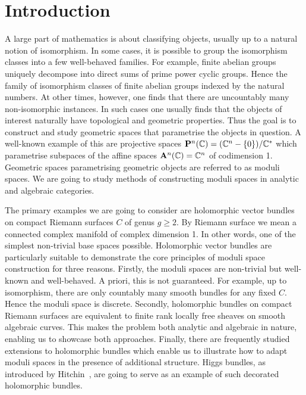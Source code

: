 \documentclass[12pt]{ociamthesis}  %
\begin{document}
\begin{romanpages}          %
  \setcounter{tocdepth}{2}
  \tableofcontents            %
\end{romanpages}            %

\chapter{Introduction}

A large part of mathematics is about classifying objects, usually
up to a natural notion of isomorphism. In some cases,
it is possible to group the isomorphism classes into a few well-behaved
families. For example, finite abelian groups uniquely decompose
into direct sums of prime power cyclic groups. Hence the family of
isomorphism classes of finite abelian groups indexed by the natural
numbers.  At other times, however, one finds that there are uncountably
many non-isomorphic instances. In such cases one usually finds that
the objects of interest naturally have topological and geometric
properties. Thus the goal is to construct and study geometric spaces
that parametrise the objects in question. A well-known example
of this are projective spaces
$\mathbf{P}^{n}_{}(\mathbb C) = (\mathbb C^n - \{0\})/\mathbb C^*$
which parametrise subspaces of the affine spaces $\mathbf{A}^{n}_{}(\mathbb C) = \mathbb C^n$
of codimension 1. Geometric
spaces parametrising geometric objects are referred to as moduli spaces.
We are going to study methods of constructing
moduli spaces in analytic and algebraic categories.

The primary examples we are going to consider are holomorphic
vector bundles on compact Riemann surfaces $C$ of genus $g\geq 2$. By Riemann surface
we mean a connected complex manifold of complex dimension 1. In other words,
one of the simplest non-trivial base spaces possible. Holomorphic vector
bundles are particularly suitable to demonstrate the core principles
of moduli space construction
for three reasons. Firstly, the moduli spaces are non-trivial but
well-known and well-behaved. A priori, this is not guaranteed. For
example, up to isomorphism, there are only countably
many smooth bundles for any fixed $C$. Hence the moduli space is
discrete. Secondly, holomorphic bundles on compact Riemann surfaces are equivalent
to finite rank locally free sheaves on smooth algebraic curves. This
makes the problem both analytic and algebraic in nature, enabling
us to showcase both approaches.
Finally, there are frequently studied extensions to holomorphic
bundles which enable us to illustrate how to adapt moduli spaces in the
presence of additional structure. Higgs bundles, as introduced by
Hitchin~\cite{hitchin1987}, are going to serve as an example
of such decorated holomorphic bundles.
\end{document}
